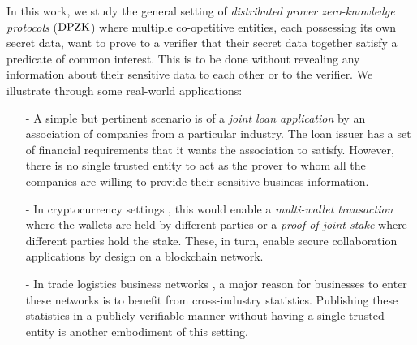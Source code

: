 In this work, we study the general setting of \textit{distributed prover
	zero-knowledge protocols} ($\text{DPZK}$) where multiple co-opetitive entities, each possessing its own secret data, want to prove to a verifier that their secret data together satisfy a predicate of common interest. This is to be done without revealing any information
about their sensitive data to each other or to the verifier. We illustrate
through some real-world applications: %
\UPDATED{}
\begin{itemize}
	\item[-] A simple but pertinent scenario is of a \textit{joint loan application} by an association of companies from a particular industry. The loan issuer has a set of financial requirements that it wants the association to satisfy. However, there is no single trusted entity to act as the prover to whom all the companies are willing to provide their sensitive business information.
	\item[-] In cryptocurrency settings \cite{bitcoin, ethereum, zerocash}, this would enable a \textit{multi-wallet transaction} where the wallets are held by different parties or a \textit{proof of joint stake} where different parties hold the stake. These, in turn, enable secure collaboration applications by design on a blockchain network. %
	\item[-] In trade logistics business networks \cite{scbn, e2open, tradelens}, a major reason for businesses to enter these networks is to benefit from cross-industry statistics. Publishing these statistics in a publicly verifiable manner without having a single trusted entity is another embodiment of this setting.

\end{itemize}
